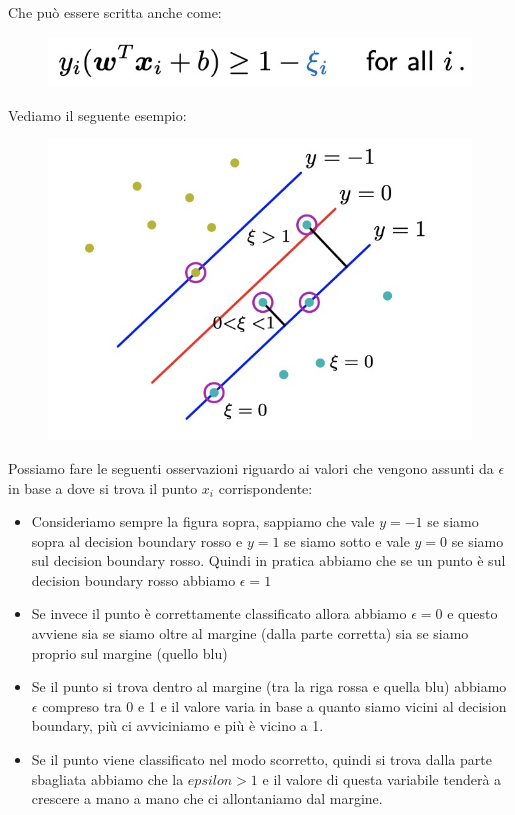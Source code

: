 \documentclass[14pt]{extreport}
\begin{document}
Che può essere scritta anche come:

\begin{figure}[H]
\centering
\includegraphics[width=0.7\linewidth]{321.jpeg}
\end{figure}

Vediamo il seguente esempio:

\begin{figure}[H]
\centering
\includegraphics[width=0.7\linewidth]{322.jpeg}
\label{fig1}
\caption{}
\end{figure}

Possiamo fare le seguenti osservazioni riguardo ai valori che vengono assunti da $\epsilon$ in base a dove si trova il punto $x_i$ corrispondente:
\begin{itemize}
\item Consideriamo sempre la figura sopra, sappiamo che vale $y=-1$ se siamo sopra al decision boundary rosso e $y=1$ se siamo sotto e vale $y=0$ se
siamo sul decision boundary rosso. Quindi in pratica abbiamo che se un punto è sul decision boundary rosso abbiamo $\epsilon=1$
\item Se invece il punto è correttamente classificato allora abbiamo $\epsilon=0$ e questo avviene sia se siamo oltre al margine (dalla parte
corretta) sia se siamo proprio sul margine (quello blu)
\item Se il punto si trova dentro al margine (tra la riga rossa e quella blu) abbiamo $\epsilon$ compreso tra 0 e 1 e il valore varia in base a quanto
siamo vicini al decision boundary, più ci avviciniamo e più è vicino a 1.
\item Se il punto viene classificato nel modo scorretto, quindi si trova dalla parte sbagliata abbiamo che la $epsilon > 1$ e il valore di questa
variabile tenderà a crescere a mano a mano che ci allontaniamo dal margine. 
\end{itemize}
\end{document}
